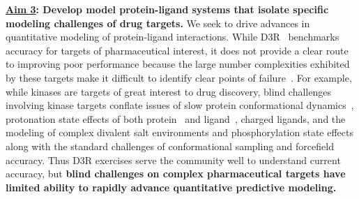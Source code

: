 \documentclass[11pt]{article}
\begin{document}
\textbf{\underline{Aim 3}: Develop model protein-ligand systems that isolate specific modeling challenges of drug targets.}
We seek to drive advances in quantitative modeling of protein-ligand interactions.
While D3R~\cite{gathiaka_d3r_2016} benchmarks accuracy for targets of pharmaceutical interest, it does not provide a clear route to improving poor performance because the large number complexities exhibited by these targets make it difficult to identify clear points of failure~\cite{ignjatovic_binding-affinity_2016, deng_large_2016, sunseri_d3r_2016, gathiaka_d3r_2016}.
For example, while kinases are targets of great interest to drug discovery, blind challenges involving kinase targets conflate issues of slow protein conformational dynamics~\cite{Lin:2013:Proc.Natl.Acad.Sci.}, protonation state effects of both protein~\cite{Shan:2009:PNAS} and ligand~\cite{Szakacs:2005:JournalofMedicinalChemistry,Grante:2014:SpectrochimicaActaPartA:MolecularandBiomolecularSpectroscopy}, charged ligands, and the modeling of complex divalent salt environments and phosphorylation state effects along with the standard challenges of conformational sampling and forcefield accuracy.
Thus D3R exercises serve the community well to understand current accuracy, but {\bf blind challenges on complex pharmaceutical targets have limited ability to rapidly advance quantitative predictive modeling.}
\end{document}

